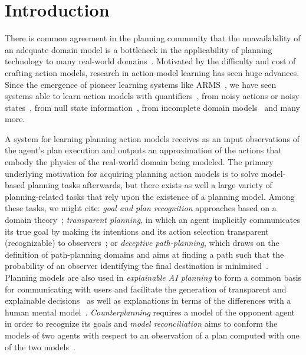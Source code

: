 
\section{Introduction}
\label{sec:introduction}

There is common agreement in the planning community that the unavailability of an adequate domain model is a bottleneck in the applicability of planning technology to many real-world domains~\cite{kambhampati:modellite:AAAI2007}. Motivated by the difficulty and cost of crafting action models, research in action-model learning has seen huge advances. Since the emergence of pioneer learning systems like ARMS~\cite{yang2007learning}, we have seen systems able to learn action models with quantifiers~\cite{AmirC08,ZhuoYHL10}, from noisy actions or noisy states~\cite{zhuo2013action,MouraoZPS12}, from null state information~\cite{cresswell2013acquiring}, from incomplete domain models~\cite{ZhuoNK13,ZhuoK17} and many more.

A system for learning planning action models receives as an input observations of the agent's plan execution and outputs an approximation of the actions that embody the physics of the real-world domain being modeled. The primary underlying motivation for acquiring planning action models is to solve model-based planning tasks afterwards, but there exists as well a large variety of planning-related tasks that rely upon the existence of a planning model. Among these tasks, we might cite: \emph{goal and plan recognition} approaches based on a domain theory~\cite{ramirez2009plan,ramirez2012plan,SohrabiRU16}; \emph{transparent planning}, in which an agent implicitly communicates its true goal by making its intentions and its action selection transparent (recognizable) to observers~\cite{MacNallyLRP18}; or \emph{deceptive path-planning}, which draws on the definition of path-planning domains and aims at finding a path such that the probability of an observer identifying the final destination is minimised~\cite{MastersS17}. Planning models are also used in \emph{explainable AI planning} to form a common basis for communicating with users and facilitate the generation of transparent and explainable decisions~\cite{FoxLM17} as well as explanations in terms of the differences with a human mental model~\cite{ChakrabortiSK18}. \emph{Counterplanning} requires a model of the opponent agent in order to recognize its goals \cite{PozancoEFB18} and \emph{model reconciliation} aims to conform the models of two agents with respect to an observation of a plan computed with one of the two models~\cite{ChakrabortiSZK17}.

